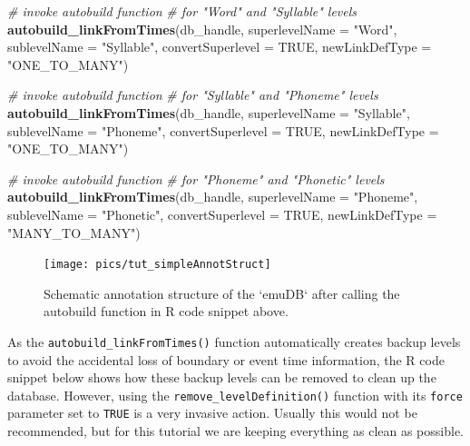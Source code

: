 \documentclass[]{book}
\newenvironment{Shaded}{\begin{snugshade}}{\end{snugshade}}
\newcommand{\CommentTok}[1]{\textcolor[rgb]{0.56,0.35,0.01}{\textit{#1}}}
\newcommand{\DataTypeTok}[1]{\textcolor[rgb]{0.13,0.29,0.53}{#1}}
\newcommand{\KeywordTok}[1]{\textcolor[rgb]{0.13,0.29,0.53}{\textbf{#1}}}
\newcommand{\NormalTok}[1]{#1}
\newcommand{\OtherTok}[1]{\textcolor[rgb]{0.56,0.35,0.01}{#1}}
\newcommand{\StringTok}[1]{\textcolor[rgb]{0.31,0.60,0.02}{#1}}
\begin{document}
\begin{Shaded}
\begin{Highlighting}[]
\CommentTok{# invoke autobuild function}
\CommentTok{# for "Word" and "Syllable" levels}
\KeywordTok{autobuild_linkFromTimes}\NormalTok{(db_handle,}
                        \DataTypeTok{superlevelName =} \StringTok{"Word"}\NormalTok{,}
                        \DataTypeTok{sublevelName =} \StringTok{"Syllable"}\NormalTok{,}
                        \DataTypeTok{convertSuperlevel =} \OtherTok{TRUE}\NormalTok{,}
                        \DataTypeTok{newLinkDefType =} \StringTok{"ONE_TO_MANY"}\NormalTok{)}

\CommentTok{# invoke autobuild function}
\CommentTok{# for "Syllable" and "Phoneme" levels}
\KeywordTok{autobuild_linkFromTimes}\NormalTok{(db_handle,}
                        \DataTypeTok{superlevelName =} \StringTok{"Syllable"}\NormalTok{,}
                        \DataTypeTok{sublevelName =} \StringTok{"Phoneme"}\NormalTok{,}
                        \DataTypeTok{convertSuperlevel =} \OtherTok{TRUE}\NormalTok{,}
                        \DataTypeTok{newLinkDefType =} \StringTok{"ONE_TO_MANY"}\NormalTok{)}

\CommentTok{# invoke autobuild function}
\CommentTok{# for "Phoneme" and "Phonetic" levels}
\KeywordTok{autobuild_linkFromTimes}\NormalTok{(db_handle,}
                        \DataTypeTok{superlevelName =} \StringTok{"Phoneme"}\NormalTok{,}
                        \DataTypeTok{sublevelName =} \StringTok{"Phonetic"}\NormalTok{,}
                        \DataTypeTok{convertSuperlevel =} \OtherTok{TRUE}\NormalTok{,}
                        \DataTypeTok{newLinkDefType =} \StringTok{"MANY_TO_MANY"}\NormalTok{)}
\end{Highlighting}
\end{Shaded}

\begin{figure}

{\centering \texttt{[image: pics/tut\_simpleAnnotStruct]} 

}

\caption{Schematic annotation structure of the `emuDB` after calling the autobuild function in R code snippet above.}\label{fig:tutorial-simpleAnnotStruct}
\end{figure}

As the \texttt{autobuild\_linkFromTimes()} function automatically creates backup levels to avoid the accidental loss of boundary or event time information, the R code snippet below shows how these backup levels can be removed to clean up the database. However, using the \texttt{remove\_levelDefinition()} function with its \texttt{force} parameter set to \texttt{TRUE} is a very invasive action. Usually this would not be recommended, but for this tutorial we are keeping everything as clean as possible.
\end{document}

